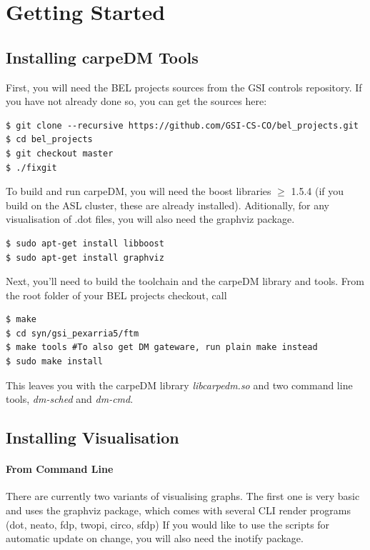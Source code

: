 \pagebreak

\section{Getting Started}

\subsection{Installing carpeDM Tools}
%
First, you will need the BEL projects sources from the GSI controls repository. If you have not already done so, you can get the sources here:
%
\begin{lstlisting}[style = customshell]
$ git clone --recursive https://github.com/GSI-CS-CO/bel_projects.git
$ cd bel_projects
$ git checkout master
$ ./fixgit
\end{lstlisting}
%
To build and run carpeDM, you will need the boost libraries $\ge$ 1.5.4 (if you build on the ASL cluster, these are already installed).
Aditionally, for any visualisation of .dot files, you will also need the graphviz package. 

\begin{lstlisting}[style = customshell]
$ sudo apt-get install libboost
$ sudo apt-get install graphviz
\end{lstlisting}

Next, you'll need to build the toolchain and the carpeDM library and tools. From the root folder of your BEL projects checkout, call
%
\begin{lstlisting}[style = customshell]
$ make
$ cd syn/gsi_pexarria5/ftm
$ make tools #To also get DM gateware, run plain make instead
$ sudo make install
\end{lstlisting}
%
This leaves you with the carpeDM library \emph{libcarpedm.so} and two command line tools, \emph{dm-sched} and \emph{dm-cmd}.

\subsection{Installing Visualisation}

\paragraph{From Command Line}
There are currently two variants of visualising graphs. The first one is very basic and uses the graphviz package, which comes with several CLI render programs (dot, neato, fdp, twopi, circo, sfdp) 
If you would like to use the scripts for automatic update on change, you will also need the inotify package.

